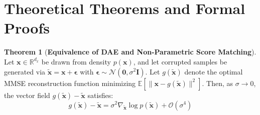 \documentclass[11pt,a4paper]{article}
\theoremstyle{definition}
\newtheorem{theorem}{\textbf{Theorem}}[section]
\begin{document}
\section{Theoretical Theorems and Formal Proofs}

\begin{theorem}[\textbf{Equivalence of DAE and Non-Parametric Score Matching}]
Let $\mathbf{x} \in \mathbb{R}^{d_x}$ be drawn from density $p(\mathbf{x})$, and let corrupted samples be generated via $\tilde{\mathbf{x}} = \mathbf{x} + \boldsymbol{\epsilon}$ with $\boldsymbol{\epsilon} \sim \mathcal{N}(\mathbf{0}, \sigma^2 \mathbf{I})$. Let $g(\tilde{\mathbf{x}})$ denote the optimal MMSE reconstruction function minimizing $\mathbb{E}[\|\mathbf{x} - g(\tilde{\mathbf{x}})\|^2]$. Then, as $\sigma \to 0$, the vector field $g(\tilde{\mathbf{x}}) - \tilde{\mathbf{x}}$ satisfies:
{\boldmath
\begin{equation}
g(\tilde{\mathbf{x}}) - \tilde{\mathbf{x}} = \sigma^2 \nabla_{\tilde{\mathbf{x}}} \log p(\tilde{\mathbf{x}}) + \mathcal{O}(\sigma^4)
\end{equation}
}
\end{theorem}
\end{document}
